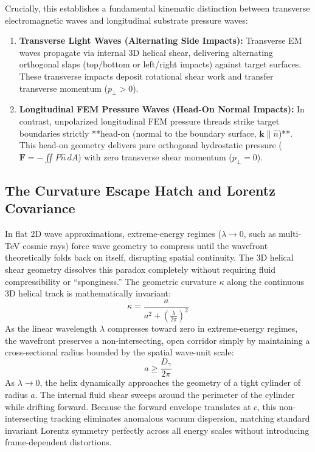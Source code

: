 \documentclass[11pt,a4paper]{article}
\begin{document}
	Crucially, this establishes a fundamental kinematic distinction between transverse electromagnetic waves and longitudinal substrate pressure waves:
	\begin{enumerate}
		\item \textbf{Transverse Light Waves (Alternating Side Impacts):} Transverse EM waves propagate via internal 3D helical shear, delivering alternating orthogonal slaps (top/bottom or left/right impacts) against target surfaces. These transverse impacts deposit rotational shear work and transfer transverse momentum ($p_\perp > 0$).
		\item \textbf{Longitudinal FEM Pressure Waves (Head-On Normal Impacts):} In contrast, unpolarized longitudinal FEM pressure threads strike target boundaries strictly **head-on (normal to the boundary surface, $\mathbf{k} \parallel \hat{n}$)**. This head-on geometry delivers pure orthogonal hydrostatic pressure ($\mathbf{F} = -\iint P \hat{n} \, dA$) with zero transverse shear momentum ($p_\perp = 0$).
	\end{enumerate}
	
	\subsection{The Curvature Escape Hatch and Lorentz Covariance}
	In flat 2D wave approximations, extreme-energy regimes ($\lambda \to 0$, such as multi-TeV cosmic rays) force wave geometry to compress until the wavefront theoretically folds back on itself, disrupting spatial continuity. The 3D helical shear geometry dissolves this paradox completely without requiring fluid compressibility or ``sponginess.'' The geometric curvature $\kappa$ along the continuous 3D helical track is mathematically invariant:
	\begin{equation}
		\kappa = \frac{a}{a^2 + \left(\frac{\lambda}{2\pi}\right)^2}
	\end{equation}
	As the linear wavelength $\lambda$ compresses toward zero in extreme-energy regimes, the wavefront preserves a non-intersecting, open corridor simply by maintaining a cross-sectional radius bounded by the spatial wave-unit scale:
	\begin{equation}
		a \ge \frac{D_\gamma}{2\pi}
	\end{equation}
	As $\lambda \to 0$, the helix dynamically approaches the geometry of a tight cylinder of radius $a$. The internal fluid shear sweeps around the perimeter of the cylinder while drifting forward. Because the forward envelope translates at $c$, this non-intersecting tracking eliminates anomalous vacuum dispersion, matching standard invariant Lorentz symmetry perfectly across all energy scales without introducing frame-dependent distortions.
	
\end{document}
